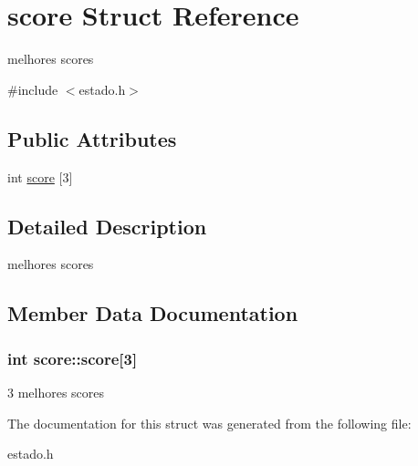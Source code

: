 \hypertarget{structscore}{}\section{score Struct Reference}
\label{structscore}


melhores scores  




{\ttfamily \#include $<$estado.\+h$>$}

\subsection*{Public Attributes}
\begin{DoxyCompactItemize}
\item 
int \hyperlink{structscore_a11cb689ebed06f21cebf5fe962397e08}{score} \mbox{[}3\mbox{]}
\end{DoxyCompactItemize}


\subsection{Detailed Description}
melhores scores 

\subsection{Member Data Documentation}
\subsubsection[{\texorpdfstring{score}{score}}]{\setlength{\rightskip}{0pt plus 5cm}int score\+::score\mbox{[}3\mbox{]}}\hypertarget{structscore_a11cb689ebed06f21cebf5fe962397e08}{}\label{structscore_a11cb689ebed06f21cebf5fe962397e08}
3 melhores scores 

The documentation for this struct was generated from the following file\+:\begin{DoxyCompactItemize}
\item 
estado.\+h\end{DoxyCompactItemize}
